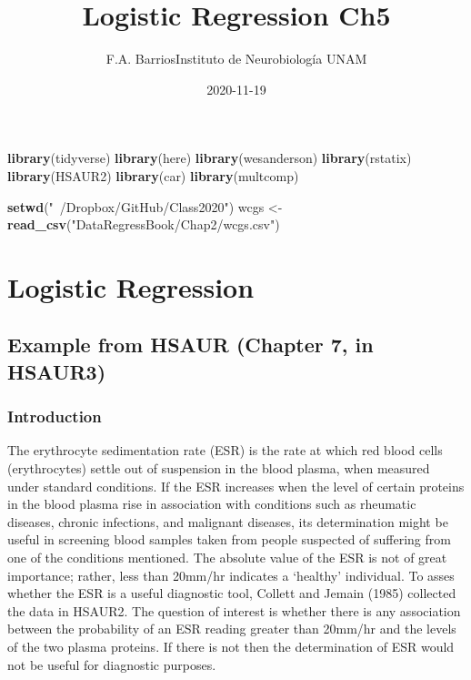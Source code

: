 \documentclass[
]{article}
\title{Logistic Regression Ch5}
\author{F.A. BarriosInstituto de Neurobiología UNAM}
\date{2020-11-19}
\newenvironment{Shaded}{\begin{snugshade}}{\end{snugshade}}
\newcommand{\KeywordTok}[1]{\textcolor[rgb]{0.13,0.29,0.53}{\textbf{#1}}}
\newcommand{\NormalTok}[1]{#1}
\newcommand{\StringTok}[1]{\textcolor[rgb]{0.31,0.60,0.02}{#1}}
\begin{document}
\maketitle

\begin{Shaded}
\begin{Highlighting}[]
\KeywordTok{library}\NormalTok{(tidyverse)}
\KeywordTok{library}\NormalTok{(here)}
\KeywordTok{library}\NormalTok{(wesanderson)}
\KeywordTok{library}\NormalTok{(rstatix)}
\KeywordTok{library}\NormalTok{(HSAUR2)}
\KeywordTok{library}\NormalTok{(car)}
\KeywordTok{library}\NormalTok{(multcomp)}

\KeywordTok{setwd}\NormalTok{(}\StringTok{"~/Dropbox/GitHub/Class2020"}\NormalTok{)}
\NormalTok{wcgs <-}\StringTok{ }\KeywordTok{read_csv}\NormalTok{(}\StringTok{"DataRegressBook/Chap2/wcgs.csv"}\NormalTok{)}
\end{Highlighting}
\end{Shaded}

\hypertarget{logistic-regression}{%
\section{Logistic Regression}\label{logistic-regression}}

\hypertarget{example-from-hsaur-chapter-7-in-hsaur3}{%
\subsection{Example from HSAUR (Chapter 7, in
HSAUR3)}\label{example-from-hsaur-chapter-7-in-hsaur3}}

\hypertarget{introduction}{%
\subsubsection{Introduction}\label{introduction}}

The erythrocyte sedimentation rate (ESR) is the rate at which red blood
cells (erythrocytes) settle out of suspension in the blood plasma, when
measured under standard conditions. If the ESR increases when the level
of certain proteins in the blood plasma rise in association with
conditions such as rheumatic diseases, chronic infections, and malignant
diseases, its determination might be useful in screening blood samples
taken from people suspected of suffering from one of the conditions
mentioned. The absolute value of the ESR is not of great importance;
rather, less than 20mm/hr indicates a `healthy' individual. To asses
whether the ESR is a useful diagnostic tool, Collett and Jemain (1985)
collected the data in HSAUR2. The question of interest is whether there
is any association between the probability of an ESR reading greater
than 20mm/hr and the levels of the two plasma proteins. If there is not
then the determination of ESR would not be useful for diagnostic
purposes.
\end{document}
